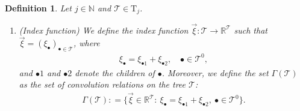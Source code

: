 \documentclass[%
11pt,  reqno]{amsart}
\newcommand{\5}{\textup{V}}
\newtheorem{definition}[theorem]{Definition}
\theoremstyle{remark}
\newcommand{\R}{\mathbb{R}}
\newcommand{\bul}{\bullet}
\newcommand{\TT}{\mathcal{T}}
\newcommand{\Tr}{\mathrm{T}}
\newcommand{\G}{\Gamma}
\newcommand{\N}{\mathbb{N}}
\numberwithin{equation}{section}
\numberwithin{theorem}{section}
\begin{document}
\begin{definition}\rm 

Let $j\in\N$ and $\TT \in \Tr_j$. 

\begin{enumerate}
\item[(i)] (Index function) 
We define the index function $\vec\xi : \TT\to \R^\TT$ such that $\vec\xi = (\xi_\bul)_{\bul\in\TT}$, where
\begin{align}
\label{parent}
\xi_\bul = \xi_{\bul1} + \xi_{\bul2}, \quad \bul\in \TT^0,
\end{align}
and $\bul1$ and $\bul2$ denote the children of $\bul$. Moreover, we define the set $\G(\TT)$ as the set of convolution relations on the tree $\TT$:
\begin{align}
\label{Gamma}
\G(\TT) : = \big\{ \vec\xi \in \R^\TT: \ \xi_\bul = \xi_{\bul1} + \xi_{\bul2}, \ \bul \in \TT^0 \big\}. 
\end{align}


\smallskip


\end{enumerate}
\end{definition}
\end{document}
